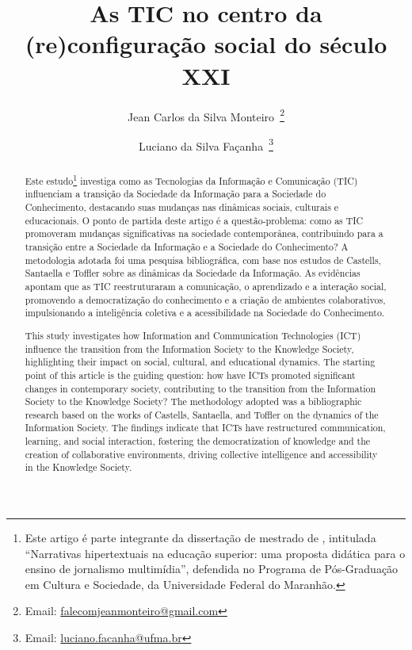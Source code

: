 \documentclass[portuguese]{textolivre}
\title{As TIC no centro da (re)configuração social do século XXI}
\author[1]{Jean Carlos da Silva Monteiro~\orcid{0000-0001-8025-3670}\thanks{Email: \href{mailto:falecomjeanmonteiro@gmail.com}{falecomjeanmonteiro@gmail.com}}}
\author[1]{Luciano da Silva Façanha~\orcid{0000-0003-1178-4018}\thanks{Email: \href{mailto:luciano.facanha@ufma.br}{luciano.facanha@ufma.br}}}
\affil[1]{Universidade Federal do Maranhão, Programa de Pós-Graduação em Cultura e Sociedade, São Luís, MA, Brasil.}
\begin{document}
\maketitle

\begin{polyabstract}
\begin{abstract}
Este estudo\footnote{Este artigo é parte integrante da dissertação de mestrado de \textcite{monteiro2019}, intitulada “Narrativas hipertextuais na educação superior: uma proposta didática para o ensino de jornalismo multimídia”, defendida no Programa de Pós-Graduação em Cultura e Sociedade, da Universidade Federal do Maranhão.} investiga como as Tecnologias da Informação e
Comunicação (TIC) influenciam a transição da Sociedade da Informação
para a Sociedade do Conhecimento, destacando suas mudanças nas dinâmicas
sociais, culturais e educacionais. O ponto de partida deste artigo é a
questão-problema: como as TIC promoveram mudanças significativas na
sociedade contemporânea, contribuindo para a transição entre a Sociedade
da Informação e a Sociedade do Conhecimento? A metodologia adotada
foi uma pesquisa bibliográfica, com base nos estudos de Castells,
Santaella e Toffler sobre as dinâmicas da Sociedade da Informação. As
evidências apontam que as TIC reestruturaram a comunicação, o
aprendizado e a interação social, promovendo a democratização do
conhecimento e a criação de ambientes colaborativos, impulsionando a
inteligência coletiva e a acessibilidade na Sociedade do Conhecimento.

\end{abstract}

\begin{english}
\begin{abstract}
This study investigates how Information and Communication
Technologies (ICT) influence the transition from the Information Society
to the Knowledge Society, highlighting their impact on social, cultural,
and educational dynamics. The starting point of this article is the
guiding question: how have ICTs promoted significant changes in
contemporary society, contributing to the transition from the
Information Society to the Knowledge Society? The methodology adopted
was a bibliographic research based on the works of Castells, Santaella,
and Toffler on the dynamics of the Information Society. The findings
indicate that ICTs have restructured communication, learning, and social
interaction, fostering the democratization of knowledge and the creation
of collaborative environments, driving collective intelligence and
accessibility in the Knowledge Society.

\end{abstract}
\end{english}
\end{polyabstract}
\end{document}
